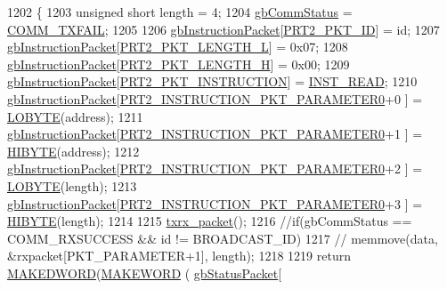 \begin{DoxyCode}
1202 \{
1203     \textcolor{keywordtype}{unsigned} \textcolor{keywordtype}{short} length = 4;
1204     \hyperlink{classdynamixel2_a703e327ba8ec5909c238dc94a00cb32d}{gbCommStatus} = \hyperlink{dynamixel_8h_af88390c8be18c4079e65fd07b8d553be}{COMM\_TXFAIL}; 
1205 
1206     \hyperlink{classdynamixel2_a298efe9115fdbf77019af1001e801fb4}{gbInstructionPacket}[\hyperlink{dynamixel_8h_a3524b007f8f56ad0d80c1d0caf7e968a}{PRT2\_PKT\_ID}]                      = id;
1207     \hyperlink{classdynamixel2_a298efe9115fdbf77019af1001e801fb4}{gbInstructionPacket}[\hyperlink{dynamixel_8h_a9e77ab568957b64786c810967dec8b0c}{PRT2\_PKT\_LENGTH\_L}]                  = 0x07;
1208     \hyperlink{classdynamixel2_a298efe9115fdbf77019af1001e801fb4}{gbInstructionPacket}[\hyperlink{dynamixel_8h_a5ea18a21d722bf72217d5408c4d2a868}{PRT2\_PKT\_LENGTH\_H}]                  = 0x00;
1209     \hyperlink{classdynamixel2_a298efe9115fdbf77019af1001e801fb4}{gbInstructionPacket}[\hyperlink{dynamixel_8h_aece9dd9d7c0fa1714d53c568865d79ad}{PRT2\_PKT\_INSTRUCTION}]                = 
      \hyperlink{dynamixel_8h_a60599b6587736bb05efb8ea3c5e5f87f}{INST\_READ};
1210     \hyperlink{classdynamixel2_a298efe9115fdbf77019af1001e801fb4}{gbInstructionPacket}[\hyperlink{dynamixel_8h_a349ccb89ae957bdcc16856ec8e2dcb00}{PRT2\_INSTRUCTION\_PKT\_PARAMETER0}+0
      ]    = \hyperlink{dynamixel_8h_a04c0416272e5c07bdf955d803a21688e}{LOBYTE}(address);
1211     \hyperlink{classdynamixel2_a298efe9115fdbf77019af1001e801fb4}{gbInstructionPacket}[\hyperlink{dynamixel_8h_a349ccb89ae957bdcc16856ec8e2dcb00}{PRT2\_INSTRUCTION\_PKT\_PARAMETER0}+1
      ]    = \hyperlink{dynamixel_8h_a75c5b5f21e837e80c0feb4da9a421f87}{HIBYTE}(address);
1212     \hyperlink{classdynamixel2_a298efe9115fdbf77019af1001e801fb4}{gbInstructionPacket}[\hyperlink{dynamixel_8h_a349ccb89ae957bdcc16856ec8e2dcb00}{PRT2\_INSTRUCTION\_PKT\_PARAMETER0}+2
      ]    = \hyperlink{dynamixel_8h_a04c0416272e5c07bdf955d803a21688e}{LOBYTE}(length);
1213     \hyperlink{classdynamixel2_a298efe9115fdbf77019af1001e801fb4}{gbInstructionPacket}[\hyperlink{dynamixel_8h_a349ccb89ae957bdcc16856ec8e2dcb00}{PRT2\_INSTRUCTION\_PKT\_PARAMETER0}+3
      ]    = \hyperlink{dynamixel_8h_a75c5b5f21e837e80c0feb4da9a421f87}{HIBYTE}(length);
1214 
1215     \hyperlink{classdynamixel2_a2cccd455a52afe99a37b249aa834cdc7}{txrx\_packet}();
1216     \textcolor{comment}{//if(gbCommStatus == COMM\_RXSUCCESS && id != BROADCAST\_ID)}
1217     \textcolor{comment}{//  memmove(data, &rxpacket[PKT\_PARAMETER+1], length);}
1218 
1219     \textcolor{keywordflow}{return} \hyperlink{dynamixel_8h_a84e53a3db3f2ef95c6085d6f3531ae0e}{MAKEDWORD}(\hyperlink{dynamixel_8h_a6b98c16b8e3e7733dd4063d0b0fac24c}{MAKEWORD} ( \hyperlink{classdynamixel2_a0776f210a190cf57d1a6faf9697a593d}{gbStatusPacket}[

\end{DoxyCode}
